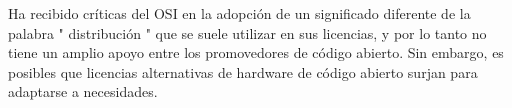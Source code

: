 Ha recibido críticas del OSI en la adopción de un significado diferente de la  palabra " distribución " que se suele utilizar en sus licencias, y por lo tanto no tiene un amplio apoyo entre los promovedores de código abierto\cite{Etiqueta13}. 
Sin embargo, es posibles que licencias alternativas de hardware de código abierto surjan para adaptarse a necesidades.










